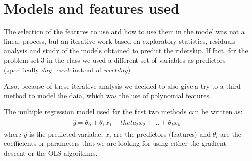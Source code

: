 \documentclass[letterpaper,10pt,english]{sphinxmanual}
\begin{document}
\section{Models and features used}
\label{section2:models-and-features-used}
The selection of the features to use and how to use them in the model was not
a linear process, but an iterative work based on exploratory statistics, residuals
analysis and study of the models obtained to predict the ridership. If fact,
for the problem set 3 in the class we used a different set of variables as
predictors (specifically \emph{day\_week} instead of \emph{weekday}).

Also, because of these iterative analysis we decided to also give a try to a
third method to model the data, which was the use of polynomial features.

The multiple regression model used for the first two methods can be written as:
\label{section2:multreg-mod}\label{section2:equation-multreg_mod}\begin{gather}
\begin{split}\hat y = \theta_0 + \theta_1 x_1 + theta_2 x_2 + ... + \theta_k x_k\end{split}\label{section2-multreg_mod}
\end{gather}
where \(\hat y\) is the predicted variable, \(x_i\) are the predictors
(features) and \(\theta_i\) are the coefficients or parameters that we are
looking for using either the gradient descent or the OLS algorithms.
\end{document}
